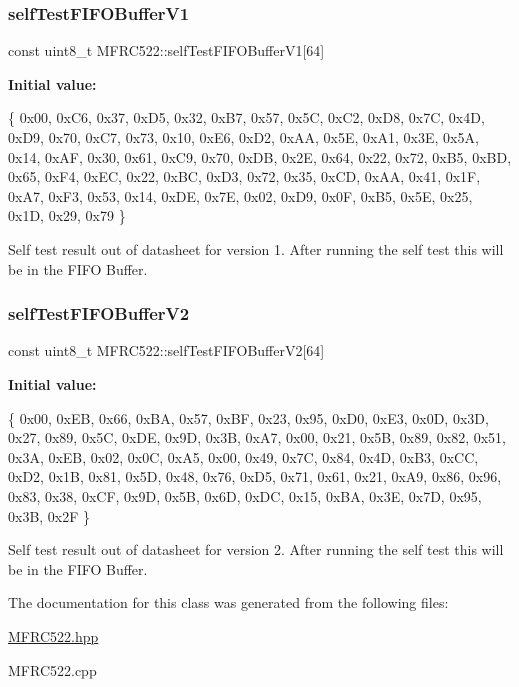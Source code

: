 \subsubsection{\texorpdfstring{self\+Test\+F\+I\+F\+O\+Buffer\+V1}{selfTestFIFOBufferV1}}
{\footnotesize\ttfamily const uint8\+\_\+t M\+F\+R\+C522\+::self\+Test\+F\+I\+F\+O\+Buffer\+V1\mbox{[}64\mbox{]}}

{\bfseries Initial value\+:}
\begin{DoxyCode}
\{
        0x00, 0xC6, 0x37, 0xD5, 0x32, 0xB7, 0x57, 0x5C,
        0xC2, 0xD8, 0x7C, 0x4D, 0xD9, 0x70, 0xC7, 0x73,
        0x10, 0xE6, 0xD2, 0xAA, 0x5E, 0xA1, 0x3E, 0x5A,
        0x14, 0xAF, 0x30, 0x61, 0xC9, 0x70, 0xDB, 0x2E,
        0x64, 0x22, 0x72, 0xB5, 0xBD, 0x65, 0xF4, 0xEC,
        0x22, 0xBC, 0xD3, 0x72, 0x35, 0xCD, 0xAA, 0x41,
        0x1F, 0xA7, 0xF3, 0x53, 0x14, 0xDE, 0x7E, 0x02,
        0xD9, 0x0F, 0xB5, 0x5E, 0x25, 0x1D, 0x29, 0x79
    \}
\end{DoxyCode}


Self test result out of datasheet for version 1. After running the self test this will be in the F\+I\+FO Buffer. 

\mbox{\label{classMFRC522_a6973b73a8a922ac09b9d89489bdbc333}} 
\subsubsection{\texorpdfstring{self\+Test\+F\+I\+F\+O\+Buffer\+V2}{selfTestFIFOBufferV2}}
{\footnotesize\ttfamily const uint8\+\_\+t M\+F\+R\+C522\+::self\+Test\+F\+I\+F\+O\+Buffer\+V2\mbox{[}64\mbox{]}}

{\bfseries Initial value\+:}
\begin{DoxyCode}
\{
        0x00, 0xEB, 0x66, 0xBA, 0x57, 0xBF, 0x23, 0x95,
        0xD0, 0xE3, 0x0D, 0x3D, 0x27, 0x89, 0x5C, 0xDE,
        0x9D, 0x3B, 0xA7, 0x00, 0x21, 0x5B, 0x89, 0x82,
        0x51, 0x3A, 0xEB, 0x02, 0x0C, 0xA5, 0x00, 0x49,
        0x7C, 0x84, 0x4D, 0xB3, 0xCC, 0xD2, 0x1B, 0x81,
        0x5D, 0x48, 0x76, 0xD5, 0x71, 0x61, 0x21, 0xA9,
        0x86, 0x96, 0x83, 0x38, 0xCF, 0x9D, 0x5B, 0x6D,
        0xDC, 0x15, 0xBA, 0x3E, 0x7D, 0x95, 0x3B, 0x2F
    \}
\end{DoxyCode}


Self test result out of datasheet for version 2. After running the self test this will be in the F\+I\+FO Buffer. 



The documentation for this class was generated from the following files\+:\begin{DoxyCompactItemize}
\item 
\hyperlink{MFRC522_8hpp}{M\+F\+R\+C522.\+hpp}\item 
M\+F\+R\+C522.\+cpp\end{DoxyCompactItemize}
